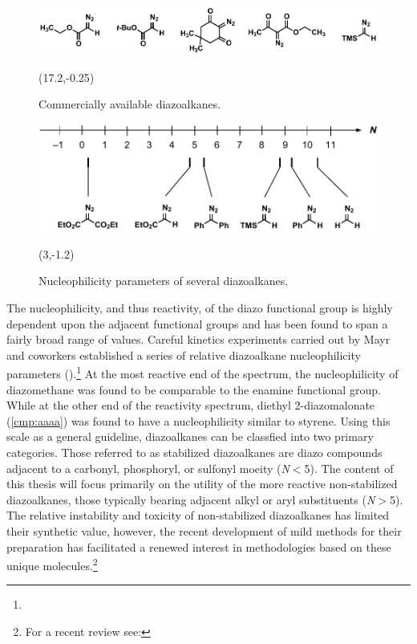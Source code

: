 \begin{figure}[b]
  \centering
  \includegraphics[scale=0.8]{chp_diazobkg/images/commercialdiazos}
  \begin{textblock}{1}(17.2,-0.25)  \end{textblock}
  \caption{Commercially available diazoalkanes.}
  \label{fig:commercial}
\end{figure}

 \begin{figure}[t]
  \centering
  \includegraphics[scale=0.8]{chp_diazobkg/images/nucleophilicity}
  \begin{textblock}{1}(3,-1.2)  \end{textblock}
  \caption{Nucleophilicity parameters of several diazoalkanes.}
  \label{fig:nucleophilicity}
\end{figure}
The nucleophilicity, and thus reactivity,
of the diazo functional group is highly dependent upon the adjacent functional groups and has been
found to span a fairly broad range of values. 
Careful kinetics experiments carried out by Mayr and coworkers established a series of relative
diazoalkane nucleophilicity parameters ().\footnote{} At the most reactive end of the spectrum, the
nucleophilicity of diazomethane was found to be comparable to the enamine functional group. While at
the other end of the reactivity spectrum, diethyl 2-diazomalonate (\ref{cmp:aaaa})
was found to have a nucleophilicity similar to styrene. Using this scale as a
general guideline, diazoalkanes can be classfied into two primary categories. Those referred to as
stabilized diazoalkanes are diazo compounds  adjacent to a carbonyl, phosphoryl, or sulfonyl moeity
(\textit{N}$<$5). The content of this thesis will focus primarily on the utility of the more
reactive non-stabilized diazoalkanes, those typically bearing adjacent alkyl or aryl substituents (\textit{N}$>$5). The relative instability and toxicity
of non-stabilized diazoalkanes has limited their synthetic value, however, the recent
development of mild methods for their preparation has facilitated a renewed interest
in methodologies based on these unique molecules.\footnote{For a recent review see:
} 


